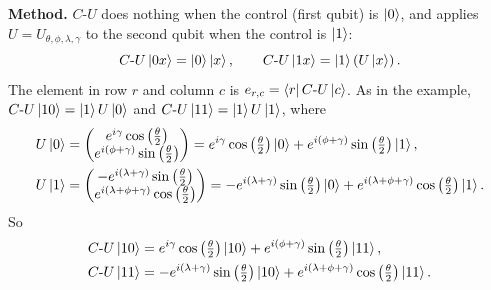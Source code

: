 \documentclass[a4paper, 10pt]{article}
\begin{document}
\begin{solution}
	\noindent \textbf{Method.} \( C\text{-}U \) does nothing when the control (first qubit) is \( \ket{0} \), and applies \( U = U_{\theta, \phi, \lambda, \gamma} \) to the second qubit when the control is \( \ket{1} \):
	\[
		C\text{-}U\ket{0x} = \ket{0}\ket{x}, \qquad C\text{-}U\ket{1x} = \ket{1}\left(U\ket{x}\right).
	\]
	The element in row \( r \) and column \( c \) is \( e_{r, c} = \bra{r} C\text{-}U \ket{c} \). As in the example, \( C\text{-}U\ket{10} = \ket{1}U\ket{0} \) and \( C\text{-}U\ket{11} = \ket{1}U\ket{1} \), where
	\begin{align*}
		U\ket{0} & = \begin{pmatrix} e^{i\gamma}\cos\left(\frac{\theta}{2}\right) \\ e^{i\left(\phi + \gamma\right)}\sin\left(\frac{\theta}{2}\right) \end{pmatrix} = e^{i\gamma}\cos\left(\tfrac{\theta}{2}\right)\ket{0} + e^{i\left(\phi + \gamma\right)}\sin\left(\tfrac{\theta}{2}\right)\ket{1}, \\
		U\ket{1} & = \begin{pmatrix} -e^{i\left(\lambda + \gamma\right)}\sin\left(\frac{\theta}{2}\right) \\ e^{i\left(\lambda + \phi + \gamma\right)}\cos\left(\frac{\theta}{2}\right) \end{pmatrix} = -e^{i\left(\lambda + \gamma\right)}\sin\left(\tfrac{\theta}{2}\right)\ket{0} + e^{i\left(\lambda + \phi + \gamma\right)}\cos\left(\tfrac{\theta}{2}\right)\ket{1}.
	\end{align*}
	So
	\begin{align*}
		C\text{-}U\ket{10} & = e^{i\gamma}\cos\left(\tfrac{\theta}{2}\right)\ket{10} + e^{i\left(\phi + \gamma\right)}\sin\left(\tfrac{\theta}{2}\right)\ket{11},                     \\
		C\text{-}U\ket{11} & = -e^{i\left(\lambda + \gamma\right)}\sin\left(\tfrac{\theta}{2}\right)\ket{10} + e^{i\left(\lambda + \phi + \gamma\right)}\cos\left(\tfrac{\theta}{2}\right)\ket{11}.
	\end{align*}

	\myspace


\end{solution}
\end{document}
